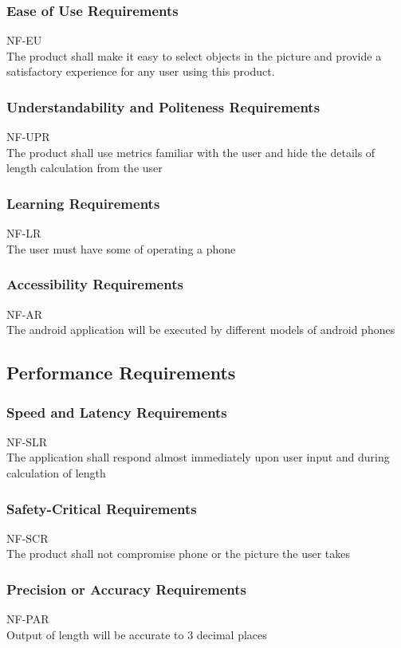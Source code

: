 \documentclass[12pt, titlepage]{article}
\begin{document}
\subsubsection{Ease of Use Requirements}
NF-EU\\
The product shall make it easy to select objects in the picture and provide a satisfactory experience for any user using this product.

\subsubsection{Understandability and Politeness Requirements}
NF-UPR\\
The product shall use metrics familiar with the user and hide the details of length calculation from the user 

\subsubsection{Learning Requirements}
NF-LR \\
The user must have some of operating a phone 

\subsubsection{Accessibility Requirements}
NF-AR \\
The android application will be executed by different models of android phones


\subsection{Performance Requirements}
\subsubsection{Speed and Latency Requirements}
NF-SLR \\
The application shall respond almost immediately upon user input and during calculation of length 

\subsubsection{Safety-Critical Requirements}
NF-SCR \\
The product shall not compromise phone or the picture the user takes

\subsubsection{Precision or Accuracy Requirements}
NF-PAR \\
Output of length will be accurate to 3 decimal places
\end{document}
